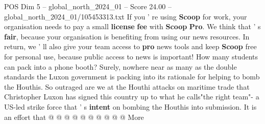 \begin{textsample}{POS Dim 5 – global\_north\_2024\_01 – Score 24.00 – global\_north\_2024\_01/105453313.txt}
If you ' re using \textbf{Scoop} for work, your organisation needs to pay a small \textbf{license} \textbf{fee} with \textbf{Scoop} \textbf{Pro}.
We think that ' s \textbf{fair}, because your organisation is benefiting from using our news resources.
In return, we ' ll also give your team access to \textbf{pro} news tools and keep \textbf{Scoop} free for personal use, because public access to news is important!
How many students can pack into a phone booth?
Surely, nowhere near as many as the double standards the Luxon government is packing into its rationale for helping to bomb the Houthis.
So outraged are we at the Houthi attacks on maritime trade that Christopher Luxon has signed this country up to what he calls"the right team"- a US-led strike force that ' s \textbf{intent} on bombing the Houthis into submission.
It is an effort that @ @ @ @ @ @ @ @ @ @ More

\end{textsample}
